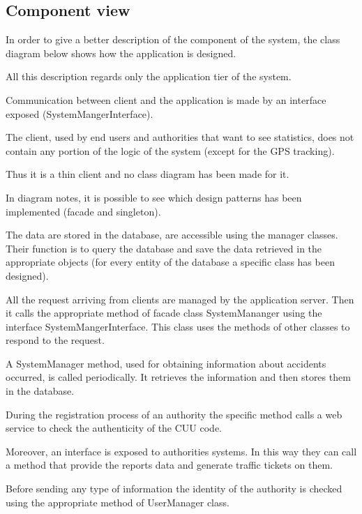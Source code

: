\subsection{Component view}
In order to give a better description of the component of the system, the class diagram below shows how the application is designed.

All this description regards only the application tier of the system.

Communication between client and the application is made by an interface exposed (SystemMangerInterface).
 
The client, used by end users and authorities that want to see statistics, does not contain any portion of the logic of the system (except for the GPS tracking). 

Thus it is a thin client and no class diagram has been made for it.

In diagram notes, it is possible to see which design patterns has been implemented (facade and singleton).

The data are stored in the database, are accessible using the manager classes. Their function is to query the database and save the data retrieved in the appropriate objects (for every entity of the database a specific class has been designed).

All the request arriving from clients are managed by the application server. Then it calls the appropriate method of facade class SystemMananger using the interface SystemMangerInterface. This class uses the methods of other classes to respond to the request.

A SystemManager method, used for obtaining information about accidents occurred, is called periodically. It retrieves the information and then stores them in the database.

During the registration process of an authority the specific method calls a web service to check the authenticity of the CUU code.

Moreover, an interface is exposed to authorities systems. In this way they can call a method that provide the reports data and generate traffic tickets on them. 

Before sending any type of information the identity of the authority is checked using the appropriate method of UserManager class.

